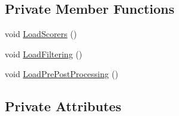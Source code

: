 \subsection*{Private Member Functions}
\begin{DoxyCompactItemize}
\item 
void \hyperlink{classamunmt_1_1God_a6ce7fae6876a5e4d39451a0de1691105}{Load\+Scorers} ()
\item 
void \hyperlink{classamunmt_1_1God_a112ca45757470e5bca5ec924538b5b80}{Load\+Filtering} ()
\item 
void \hyperlink{classamunmt_1_1God_a9fd4b0bf9cb28b74651640055f488484}{Load\+Pre\+Post\+Processing} ()
\end{DoxyCompactItemize}
\subsection*{Private Attributes}

